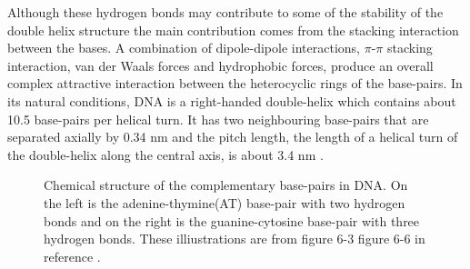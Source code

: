 %
Although these hydrogen bonds may contribute to some of the stability of the double helix structure the main contribution comes from the stacking interaction between the bases. A combination of dipole-dipole interactions, $\pi$-$\pi$ stacking interaction, van der Waals forces and hydrophobic forces, produce an overall complex attractive interaction between the heterocyclic rings of the base-pairs. In its natural conditions, DNA is a right-handed double-helix which contains about 10.5 base-pairs per helical turn. It has two neighbouring base-pairs that are separated axially by 0.34 nm and the pitch length, the length of a helical turn of the double-helix along the central axis, is about 3.4 nm  \cite{Watson1953}.
%
\begin{figure}[htp]
\centering
{}
\hspace{10mm}                
\caption{Chemical structure of the complementary base-pairs in DNA. On the left is the adenine-thymine(AT) base-pair with two hydrogen bonds and on the right is the guanine-cytosine base-pair with three hydrogen bonds. These illiustrations are from figure 6-3 figure 6-6 in reference \cite{Watson2003}.} 
\label{fig:dna_base_pairs}
\end{figure}
%
